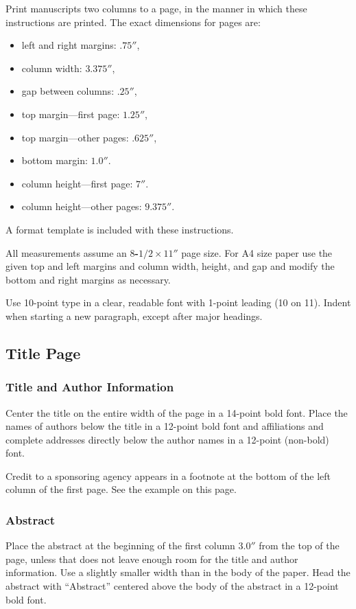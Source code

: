 Print manuscripts two columns to a page, in the manner in which these
instructions are printed.  The exact dimensions for pages are:
\begin{itemize}
\item left and right margins: $.75''$,
\item column width: $3.375''$,
\item gap between columns: $.25''$,
\item top margin---first page: $1.25''$,
\item top margin---other pages: $.625''$,
\item bottom margin: $1.0''$.
\item column height---first page: $7''$.
\item column height---other pages: $9.375''$.
\end{itemize}
A format template is included with these instructions.

All measurements assume an {\bf $8$-$1/2 \times 11''$} page size.  For A4
size paper use the given top and left margins and column width,
height, and gap and modify the bottom and right margins as necessary.

Use 10-point type in a clear, readable font with 1-point leading (10
on 11).  Indent when starting a new paragraph, except after major headings.

\subsection{Title Page}

\subsubsection{Title and Author Information}

Center the title on the entire width of the page in a 14-point bold font.
Place the names of authors below the title in a 12-point bold font and
affiliations and complete addresses directly below the author names in a
12-point (non-bold) font.

Credit to a sponsoring agency appears in a footnote at the bottom of the
left column of the first page.  See the example on this page.

\subsubsection{Abstract}

Place the abstract at the beginning of the first column $3.0''$ from the
top of the page, unless that does not leave enough room for the title and
author information.  Use a slightly smaller width than in the body of the
paper.  Head the abstract with ``Abstract'' centered above the body of the
abstract in a 12-point bold font.

